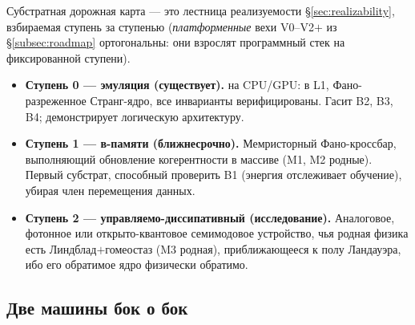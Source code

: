 Субстратная дорожная карта --- это лестница реализуемости
\S\ref{sec:realizability}, взбираемая ступень за ступенью (\emph{платформенные}
вехи V0--V2$+$ из \S\ref{subsec:roadmap} ортогональны: они взрослят
программный стек на фиксированной ступени).

\begin{itemize}[leftmargin=1.5em,itemsep=1pt]
  \item \textbf{Ступень 0 --- эмуляция (существует).} \SYNARC{} на CPU/GPU: \DM{} в L1,
        Фано-разреженное Странг-ядро, все инварианты верифицированы. Гасит B2, B3,
        B4; демонстрирует логическую архитектуру.
  \item \textbf{Ступень 1 --- в-памяти (ближнесрочно).} Мемристорный Фано-кроссбар,
        выполняющий обновление когерентности в массиве (M1, M2 родные). Первый
        субстрат, способный проверить B1 (энергия отслеживает обучение), убирая
        член перемещения данных.
  \item \textbf{Ступень 2 --- управляемо-диссипативный (исследование).} Аналоговое,
        фотонное или открыто-квантовое семимодовое устройство, чья родная физика
        есть Линдблад$+$гомеостаз (M3 родная), приближающееся к полу Ландауэра,
        ибо его обратимое ядро физически обратимо.
\end{itemize}

\subsection{Две машины бок о бок}

